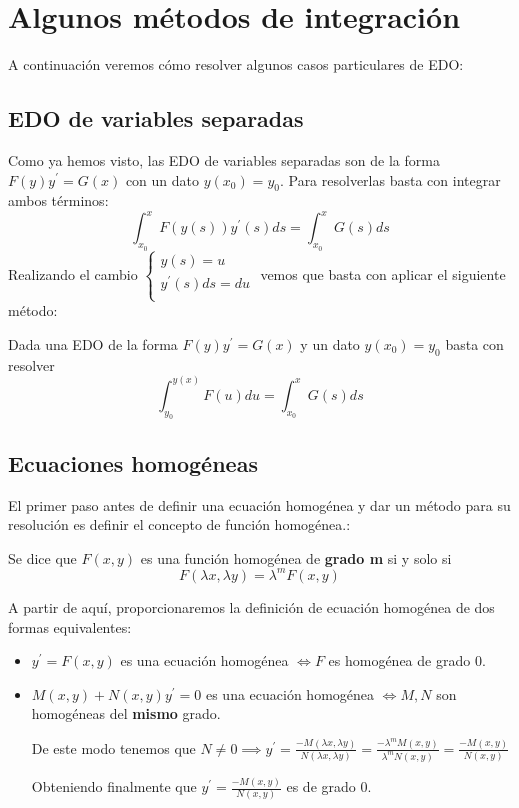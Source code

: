 \documentclass{mathnotes}
\begin{document}
\section{Algunos métodos de integración}
A continuación veremos cómo resolver algunos casos particulares de EDO:

\subsection{EDO de variables separadas}
Como ya hemos visto, las EDO de variables separadas son de la forma $F(y)y^\prime = G(x)$ con un dato $y(x_0) = y_0$.
Para resolverlas basta con integrar ambos términos:
$$\int_{x_0}^x F(y(s))y^\prime(s)ds = \int_{x_0}^x G(s)ds$$
Realizando el cambio 
$\left\lbrace
  \begin{array}{l}
     y(s) = u \\
     y^\prime(s)ds = du  \\
  \end{array}
  \right.
$ vemos que basta con aplicar el siguiente método:

\begin{method}
Dada una EDO de la forma $F(y)y^\prime = G(x)$ y un dato $y(x_0) = y_0$ basta con resolver $$\int_{y_0}^{y(x)} F(u)du = \int_{x_0}^x G(s)ds$$
\end{method} 

\subsection{Ecuaciones homogéneas}
El primer paso antes de definir una ecuación homogénea y dar un método para su resolución es definir el concepto de función homogénea.:

\begin{definition}
Se dice que $F(x,y)$ es una función homogénea de \textbf{grado m} si y solo si
$$F(\lambda x, \lambda y) = \lambda^m F(x,y)$$
\end{definition}

A partir de aquí, proporcionaremos la definición de ecuación homogénea de dos formas equivalentes:
\begin{definition}
\begin{itemize}
\item $y^\prime = F(x,y)$ es una ecuación homogénea $\iff F$ es homogénea de grado $0$.
\item $M(x,y)+N(x,y)y^\prime = 0$ es una ecuación homogénea $\iff M,N$ son homogéneas del \textbf{mismo} grado.

De este modo tenemos que $N\neq 0 \implies y^\prime = \frac{-M(\lambda x,\lambda y)}{N(\lambda x,\lambda y)} = \frac{-\lambda^mM(x,y)}{\lambda^mN(x,y)} = \frac{-M(x,y)}{N(x,y)}$

Obteniendo finalmente que $y^\prime = \frac{-M(x,y)}{N(x,y)}$ es de grado $0$.
\end{itemize}
\end{definition}
\end{document}
